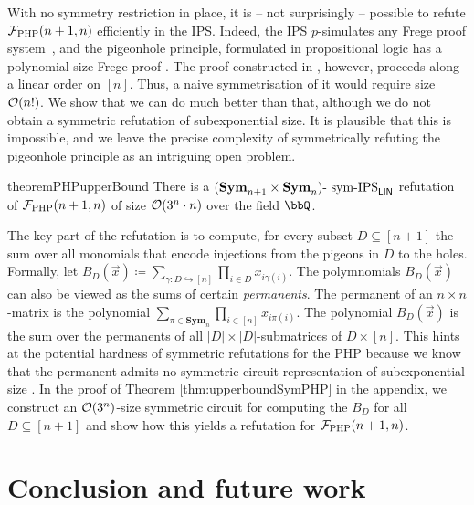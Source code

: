 \documentclass[10pt,a4paper]{article}
\newcommand{\Sym}{{\mathbf{Sym}}}
\newcommand{\Ff}{{\cal F}}
\newcommand{\Oo}{{\cal O}}
\newcommand{\PHP}{\Ff_{\mathrm{PHP}}}
\newcommand{\symIPSlin}{\text{ \upshape sym-IPS}_{\mathsf{LIN}}}
\begin{document}
With no symmetry restriction in place, it is -- not surprisingly -- possible to refute $\PHP(n+1,n)$ efficiently in the IPS.  Indeed, the IPS $p$-simulates any Frege proof system~\cite{IPS}, and the pigeonhole principle, formulated in propositional logic has a polynomial-size Frege proof \cite{buss1987polynomial}. The proof constructed in \cite{buss1987polynomial}, however, proceeds along a linear order on $[n]$. Thus, a naive symmetrisation of it would require size $\Oo(n!)$.
We show that we can do much better than that, although we do not obtain a symmetric refutation of subexponential size. It is plausible that this is impossible, and we leave the precise complexity of symmetrically refuting the pigeonhole principle as an intriguing open problem.

\begin{restatable}{theorem}{PHPupperBound}
	\label{thm:upperboundSymPHP}
	There is a $(\Sym_{n+1} \times \Sym_n)\text{-}\symIPSlin$ refutation of $\PHP(n+1,n)$ of size $\Oo(3^n \cdot n)$ over the field $\bbQ$.
\end{restatable}	

The key part of the refutation is to compute, for every subset $D \subseteq [n+1]$ the sum over all monomials that encode injections from the pigeons in $D$ to the holes. Formally, let
$
B_D(\vec x) \coloneqq \sum_{\gamma \colon D \hookrightarrow [n]} \prod_{i \in D} x_{i\gamma(i)}.
$
The polymnomials $B_D(\vec x)$ can also be viewed as the sums of certain \emph{permanents}. The permanent of an $n \times n$-matrix is the polynomial $\sum_{\pi \in \Sym_n} \prod_{i \in [n]} x_{i\pi(i)}$. The polynomial $B_D(\vec x)$ is the sum over the permanents of all $|D| \times |D|$-submatrices of $D \times [n]$. 
This hints at the potential hardness of symmetric refutations for the PHP because we know that the permanent admits no symmetric circuit representation of subexponential size \cite{DawarW20}. 
In the proof of Theorem \ref{thm:upperboundSymPHP} in the appendix, we construct an $\Oo(3^n)$-size symmetric circuit for computing the $B_D$ for all $D \subseteq [n+1]$ and show how this yields a refutation for $\PHP(n+1,n)$.


\section{Conclusion and future work}
\end{document}
